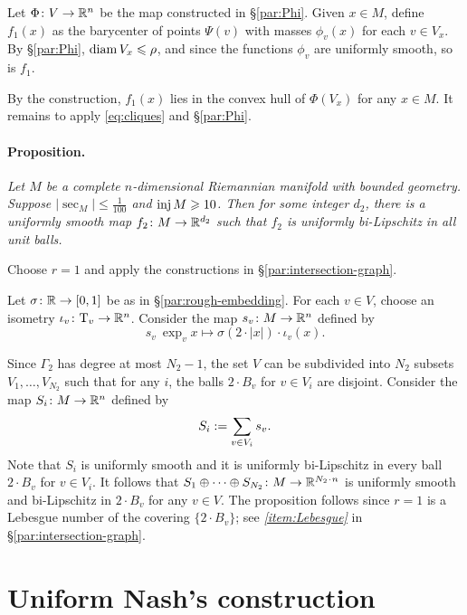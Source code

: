 \arxiv{\documentclass[a4paper,10pt]{article}}{\documentclass{mjm}}
\begin{document}
Let $\Phi\colon V\to\mathbb{R}^{n}$ be the map constructed in §\ref{par:Phi}.
Given $x\in M$, define $f_1(x)$ as the barycenter of points $\Psi(v)$ with masses $\phi_v(x)$ for each $v\in V_x$.
By §\ref{par:Phi}, $\operatorname{\rm diam} V_x\leqslant \rho$,
and since the functions $\phi_v$ are uniformly smooth, so is $f_1$.

By the construction, $f_1(x)$ lies in the convex hull of $\Phi(V_x)$ for any $x\in M$.
It remains to apply \ref{eq:cliques} and §\ref{par:Phi}.
\qeds

\paragraph{Proposition.}\label{par:local-embedding}
\textit{
Let $M$ be a complete $n$-dimensional Riemannian manifold with bounded geometry.
Suppose $|\sec_M|\le \tfrac1{100}$ and $\operatorname{\rm inj} M\geqslant 10$.
Then for some integer $d_2$, there is a uniformly smooth map $f_2\colon M\to\mathbb{R}^{d_2}$ such that 
$f_2$ is uniformly bi-Lipschitz in all unit balls.
}

Choose $r=1$ and apply the constructions in §\ref{par:intersection-graph}.

Let $\sigma\colon\mathbb{R}\to[0,1]$ be as in §\ref{par:rough-embedding}.
For each $v\in V$, choose an isometry $\iota_v\:\T_v\z\to\RR^n$.
Consider the map $s_v\colon M\to \mathbb{R}^n$ defined by
\[s_v\:\exp_vx\mapsto \sigma(2\cdot |x|)\cdot \iota_v(x).\]

Since $\Gamma_2$ has degree at most $N_2-1$,
the set $V$ can be subdivided into $N_2$ subsets $V_1,\dots, V_{N_2}$ such that 
for any $i$, the balls $2\cdot B_v$ for $v\in V_i$ are disjoint.
Consider the map $S_i\colon M\to\mathbb{R}^n$ defined by
\[S_i\mathrel{{:}{=}}\sum_{v\in V_i}s_v.\]
Note that $S_i$ is uniformly smooth and it is uniformly bi-Lipschitz in every ball $2\cdot B_v$ for $v\in V_i$.
It follows that $S_1\oplus\dots\oplus S_{N_2}\:M\to \RR^{N_2\cdot n}$ is uniformly smooth and bi-Lipschitz in  $2\cdot B_v$ for any $v\in V$.
The proposition follows since $r=1$ is a Lebesgue number of the covering $\{2\cdot B_v\}$; see \textit{\ref{item:Lebesgue}} in §\ref{par:intersection-graph}.
\qeds

\section*{Uniform Nash's construction}
\end{document}
